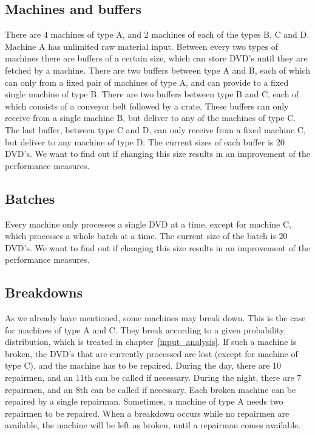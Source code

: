 \documentclass{article}
\begin{document}
\subsection{Machines and buffers}
There are 4 machines of type A, and 2 machines of each of the types B, C and D.
Machine A has unlimited raw material input.
Between every two types of machines there are buffers of a certain size, which can store DVD's until they are fetched by a machine.
There are two buffers between type A and B, each of which can only from a fixed pair of machines of type A, and can provide to a fixed single machine of type B.
There are two buffers between type B and C, each of which consists of a conveyor belt followed by a crate.
These buffers can only receive from a single machine B, but deliver to any of the machines of type C.
The last buffer, between type C and D, can only receive from a fixed machine C, but deliver to any machine of type D.
The current sizes of each buffer is 20 DVD's.
We want to find out if changing this size results in an improvement of the performance measures.

\subsection{Batches}
Every machine only processes a single DVD at a time, except for machine C, which processes a whole batch at a time.
The current size of the batch is 20 DVD's.
We want to find out if changing this size results in an improvement of the performance measures.

\subsection{Breakdowns}
As we already have mentioned, some machines may break down.
This is the case for machines of type A and C.
They break according to a given probability distribution, which is treated in chapter~\ref{input_analysis}.
If such a machine is broken, the DVD's that are currently processed are lost (except for machine of type C), and the machine has to be repaired.
During the day, there are 10 repairmen, and an 11th can be called if necessary.
During the night, there are 7 repairmen, and an 8th can be called if necessary.
Each broken machine can be repaired by a single repairman.
Sometimes, a machine of type A needs two repairmen to be repaired.
When a breakdown occurs while no repairmen are available, the machine will be left as broken, until a repairman comes available.
\end{document}
